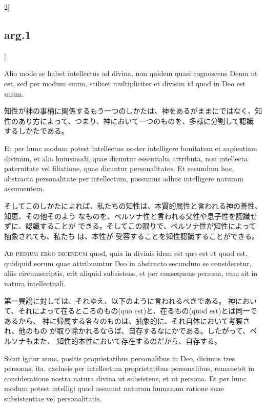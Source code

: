 \documentclass[paper=a4paper,fontsize=10pt,jafontsize=9pt,titlepage]{jlreq}
\begin{document}
\begin{paracol}{2}[\subsection{arg.1}]
\switchcolumn*

Alio modo se habet intellectus ad divina, non
quidem quasi cognoscens Deum ut est, sed per modum suum, scilicet
multipliciter et divisim id quod in Deo est unum.

\switchcolumn

知性が神の事柄に関係するもう一つのしかたは、神をあるがままにではなく、知
 性のあり方によって、つまり、神において一つのものを、多様に分割して認識
 するしかたである。

\switchcolumn*

Et per hunc modum
potest intellectus noster intelligere bonitatem et sapientiam divinam,
et alia huiusmodi, quae dicuntur essentialia attributa, non intellecta
paternitate vel filiatione, quae dicuntur personalitates. Et secundum
hoc, abstracta personalitate per intellectum, possumus adhuc intelligere
naturam assumentem.

\switchcolumn

そしてこのしかたによれば、私たちの知性は、本質的属性と言われる神の善性、知恵、その他そのよう
 なものを、ペルソナ性と言われる父性や息子性を認識せずに、認識することが
 できる。そしてこの限りで、ペルソナ性が知性によって抽象されても、私たち
 は、本性が
 受容することを知性認識することができる。

\switchcolumn*[\subsection{ad.1}]

{\scshape Ad primum ergo dicendum} quod, quia in divinis idem est quo est et quod
est, quidquid eorum quae attribuuntur Deo in abstracto secundum se
consideretur, aliis circumscriptis, erit aliquid subsistens, et per
consequens persona, cum sit in natura intellectuali.

\switchcolumn

第一異論に対しては、それゆえ、以下のように言われるべきである。
神において、それによって在るところのもの(quo est)と、在るもの(quod est)とは同一であるから、
 神に帰属する各々のものは、抽象的に、それ自体において考察され、他のもの
 が取り除かれるならば、自存するなにかである。したがって、ペルソナもまた、
 知性的本性において存在するのだから、自存する。

\switchcolumn*

Sicut igitur nunc,
positis proprietatibus personalibus in Deo, dicimus tres personas, ita,
exclusis per intellectum proprietatibus personalibus, remanebit in
consideratione nostra natura divina ut subsistens, et ut persona. Et per
hunc modum potest intelligi quod assumat naturam humanam ratione suae
subsistentiae vel personalitatis.


\end{paracol}
\end{document}
